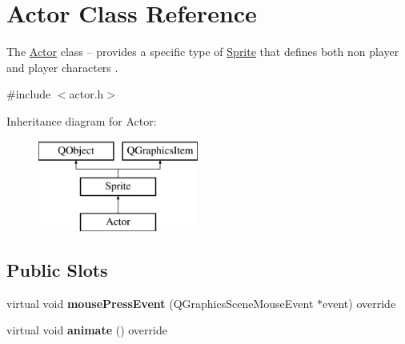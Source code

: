 \hypertarget{class_actor}{}\section{Actor Class Reference}
\label{class_actor}


The \hyperlink{class_actor}{Actor} class -- provides a specific type of \hyperlink{class_sprite}{Sprite} that defines both non player and player characters .  




{\ttfamily \#include $<$actor.\+h$>$}

Inheritance diagram for Actor\+:\begin{figure}[H]
\begin{center}
\leavevmode
\includegraphics[height=3.000000cm]{class_actor}
\end{center}
\end{figure}
\subsection*{Public Slots}
\begin{DoxyCompactItemize}
\item 
\mbox{\label{class_actor_abfb178899dad2f9e42f16280c7fe31e6}} 
virtual void {\bfseries mouse\+Press\+Event} (Q\+Graphics\+Scene\+Mouse\+Event $\ast$event) override
\item 
\mbox{\label{class_actor_ad1534650c6dbffefd97662ce24f1f82c}} 
virtual void {\bfseries animate} () override
\end{DoxyCompactItemize}
